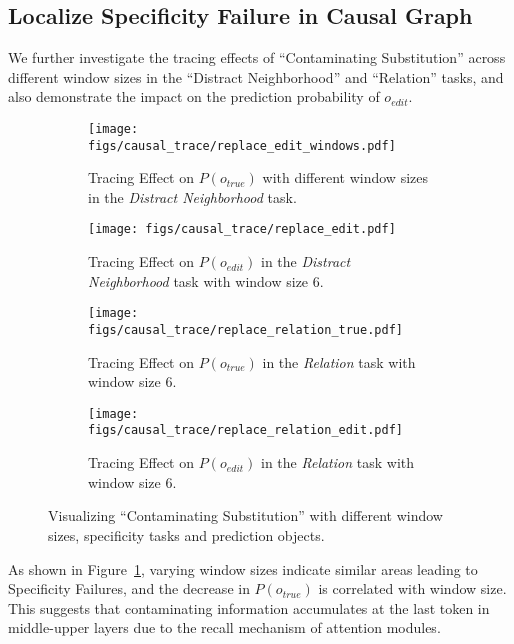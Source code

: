 \subsection{Localize Specificity Failure in Causal Graph}
\label{app:localize_module}
We further investigate the tracing effects of ``Contaminating Substitution'' across different window sizes in the ``Distract Neighborhood'' and ``Relation'' tasks, and also demonstrate the impact on the prediction probability of $o_{edit}$.
\begin{figure}[htbp]
    \centering
    \begin{subfigure}{0.99\textwidth}
        \centering
        \texttt{[image: figs/causal\_trace/replace\_edit\_windows.pdf]}
        \caption{Tracing Effect on $P(o_{true})$ with different window sizes in the \textit{Distract Neighborhood} task.}
        \label{fig:replace-windows}
    \end{subfigure}%
    \vspace{5pt}

    \begin{subfigure}{0.99\textwidth}
        \centering
        \texttt{[image: figs/causal\_trace/replace\_edit.pdf]}
        \caption{Tracing Effect on $P(o_{edit})$ in the \textit{Distract Neighborhood} task with window size 6.}
        \label{fig:replace-edit}
    \end{subfigure}
    \vspace{5pt}

    \begin{subfigure}{0.99\textwidth}
        \centering
        \texttt{[image: figs/causal\_trace/replace\_relation\_true.pdf]}
        \caption{Tracing Effect on $P(o_{true})$ in the \textit{Relation} task with window size 6.}
        \label{fig:replace-relation-true}
    \end{subfigure}
    \vspace{5pt}

    \begin{subfigure}{0.99\textwidth}
        \centering
        \texttt{[image: figs/causal\_trace/replace\_relation\_edit.pdf]}
        \caption{Tracing Effect on $P(o_{edit})$ in the \textit{Relation} task with window size 6.}
        \label{fig:replace-relation-edit}
    \end{subfigure}
    
    \caption{Visualizing ``Contaminating Substitution'' with different window sizes, specificity tasks and prediction objects.}
    \label{fig:causal_tracee_appendix}
\end{figure}
As shown in Figure~\ref{fig:replace-windows}, varying window sizes indicate similar areas leading to Specificity Failures, and the decrease in $P(o_{true})$ is correlated with window size. This suggests that contaminating information accumulates at the last token in middle-upper layers due to the recall mechanism of attention modules.

